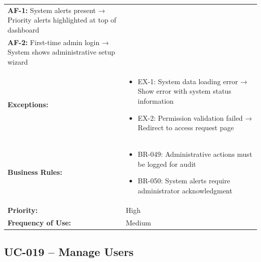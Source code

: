 \documentclass[12pt,a4paper]{article}
\begin{document}
\begin{longtable}{|p{4.5cm}|p{10.5cm}|}
\textbf{AF-1:} System alerts present → Priority alerts highlighted at top of dashboard \\
\textbf{AF-2:} First-time admin login → System shows administrative setup wizard \\
\hline
\textbf{Exceptions:} &
\begin{itemize}
  \item EX-1: System data loading error → Show error with system status information
  \item EX-2: Permission validation failed → Redirect to access request page
\end{itemize} \\
\hline
\textbf{Business Rules:} &
\begin{itemize}
  \item BR-049: Administrative actions must be logged for audit
  \item BR-050: System alerts require administrator acknowledgment
\end{itemize} \\
\hline
\textbf{Priority:} & High \\
\hline
\textbf{Frequency of Use:} & Medium \\
\hline
\end{longtable}

\subsection{UC-019 – Manage Users}
\end{document}
